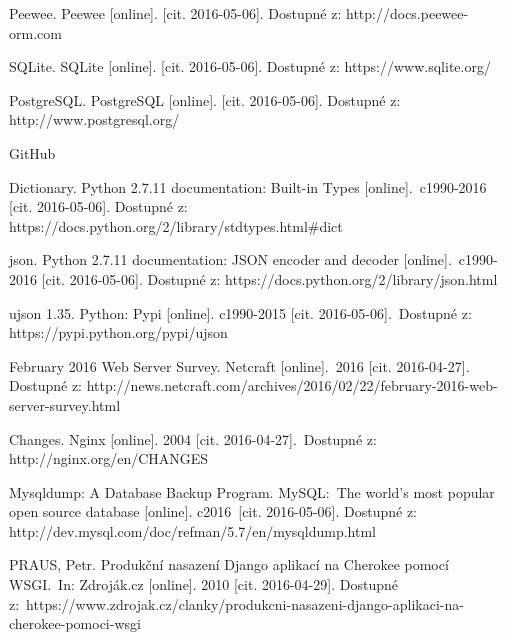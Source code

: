 \begin{thebibliography}{1}

 Peewee. Peewee [online]. [cit. 2016-05-06]. Dostupné z: http://docs.peewee-orm.com

 SQLite. SQLite [online]. [cit. 2016-05-06]. Dostupné z: https://www.sqlite.org/

 PostgreSQL. PostgreSQL [online]. [cit. 2016-05-06]. Dostupné z: http://www.postgresql.org/

 GitHub


 Dictionary. Python 2.7.11 documentation: Built-in Types [online].\
c1990-2016 [cit. 2016-05-06]. Dostupné z: https://docs.python.org/2/library/stdtypes.html\#dict


 json. Python 2.7.11 documentation: JSON encoder and decoder [online].\
c1990-2016 [cit. 2016-05-06]. Dostupné z: https://docs.python.org/2/library/json.html

\bibitem{python_ujson} ujson 1.35. Python: Pypi [online]. c1990-2015 [cit. 2016-05-06].\
Dostupné z: https://pypi.python.org/pypi/ujson


 February 2016 Web Server Survey. Netcraft [online].\
2016 [cit. 2016-04-27]. Dostupné z: http://news.netcraft.com/archives/2016/02/22/february-2016-web-server-survey.html

 Changes. Nginx [online]. 2004 [cit. 2016-04-27].\
Dostupné z: http://nginx.org/en/CHANGES

\bibitem{mysqldump} Mysqldump: A Database Backup Program. MySQL:\
The world's most popular open source database [online]. c2016\
[cit. 2016-05-06]. Dostupné z: http://dev.mysql.com/doc/refman/5.7/en/mysqldump.html

\bibitem{uwsgi} PRAUS, Petr. Produkční nasazení Django aplikací na Cherokee pomocí WSGI.\
In: Zdroják.cz [online]. 2010 [cit. 2016-04-29]. Dostupné z:\
https://www.zdrojak.cz/clanky/produkcni-nasazeni-django-aplikaci-na-cherokee-pomoci-wsgi

\end{thebibliography}